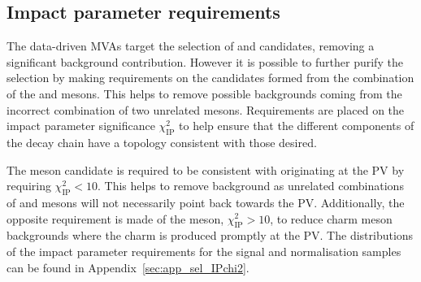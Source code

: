 

\subsection{Impact parameter requirements}
\label{sec:selection_IPCHI2}
The data-driven MVAs target the selection of \phiz and \Dsp candidates, removing a significant background contribution. However it is possible to further purify the selection by making requirements on the \Bp candidates formed from the combination of the \Dsp and \phiz mesons. This helps to remove possible backgrounds coming from the incorrect combination of two unrelated mesons. Requirements are placed on the impact parameter significance $\chi^{2}_{\text{IP}}$ to help ensure that the different components of the decay chain have a topology consistent with those desired.

The \Bp meson candidate is required to be consistent with originating at the PV by requiring $\chi^2_{\text{IP}} < 10$. This helps to remove background as unrelated combinations of \Dsp and \phiz mesons will not necessarily point back towards the PV.
Additionally, the opposite requirement is made of the \Dsp meson, $\chi^2_{\text{IP}} > 10$, to reduce charm meson backgrounds where the charm is produced promptly at the PV.
The distributions of the impact parameter requirements for the signal and normalisation samples can be found in Appendix~\ref{sec:app_sel_IPchi2}.



